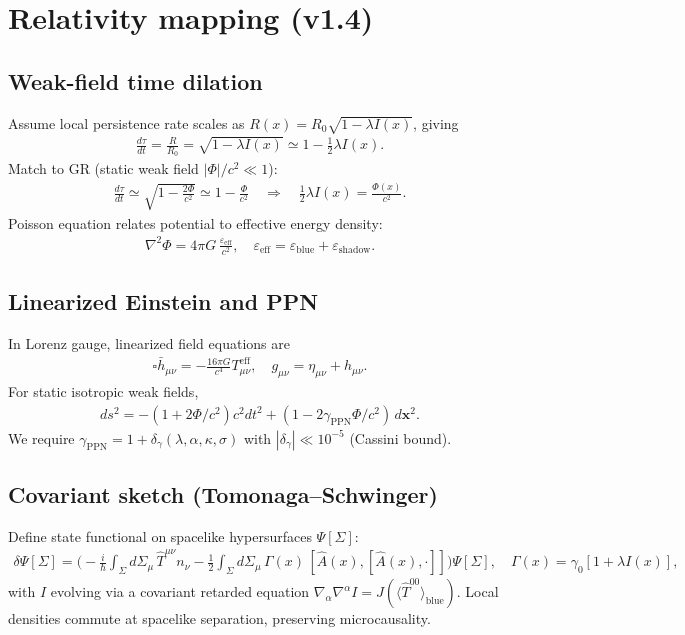 \documentclass[11pt]{article}
\begin{document}
\section{Relativity mapping (v1.4)}
\subsection{Weak-field time dilation}
Assume local persistence rate scales as $R(x)=R_0\sqrt{1-\lambda I(x)}$, giving
\begin{align}
\frac{d\tau}{dt}=\frac{R}{R_0}=\sqrt{1-\lambda I(x)}\simeq 1-\frac12\lambda I(x).
\end{align}
Match to GR (static weak field $|\Phi|/c^2\ll1$):
\begin{align}
\frac{d\tau}{dt}\simeq \sqrt{1-\frac{2\Phi}{c^2}}\simeq 1-\frac{\Phi}{c^2}\quad\Rightarrow\quad \frac12\lambda I(x)=\frac{\Phi(x)}{c^2}. \label{eq:PhiMap}
\end{align}
Poisson equation relates potential to effective energy density:
\begin{align}
\nabla^2\Phi=4\pi G\,\frac{\varepsilon_{\mathrm{eff}}}{c^2},\quad \varepsilon_{\mathrm{eff}}=\varepsilon_{\mathrm{blue}}+\varepsilon_{\mathrm{shadow}}. \label{eq:Poisson}
\end{align}

\subsection{Linearized Einstein and PPN}
In Lorenz gauge, linearized field equations are
\begin{align}
\square \bar h_{\mu\nu}=-\frac{16\pi G}{c^4}T^{\mathrm{eff}}_{\mu\nu},\quad g_{\mu\nu}=\eta_{\mu\nu}+h_{\mu\nu}.
\end{align}
For static isotropic weak fields,
\begin{align}
ds^2=-(1+2\Phi/c^2)c^2dt^2+(1-2\gamma_{\mathrm{PPN}}\Phi/c^2)\,d\mathbf x^2.
\end{align}
We require $\gamma_{\mathrm{PPN}}=1+\delta_\gamma(\lambda,\alpha,\kappa,\sigma)$ with $|\delta_\gamma|\ll 10^{-5}$ (Cassini bound).

\subsection{Covariant sketch (Tomonaga--Schwinger)}
Define state functional on spacelike hypersurfaces $\Psi[\Sigma]$:
\begin{align}
\delta\Psi[\Sigma]=\Big(-\tfrac{i}{\hbar}\int_\Sigma d\Sigma_\mu\,\hat T^{\mu\nu}n_\nu
-\tfrac12\int_\Sigma d\Sigma_\mu\,\Gamma(x)\,[\hat A(x),[\hat A(x),\cdot]]\Big)\Psi[\Sigma],\quad \Gamma(x)=\gamma_0[1+\lambda I(x)],
\end{align}
with $I$ evolving via a covariant retarded equation $\nabla_\alpha\nabla^\alpha I=J(\langle \hat T^{00}\rangle_{\mathrm{blue}})$. Local densities commute at spacelike separation, preserving microcausality.
\end{document}
